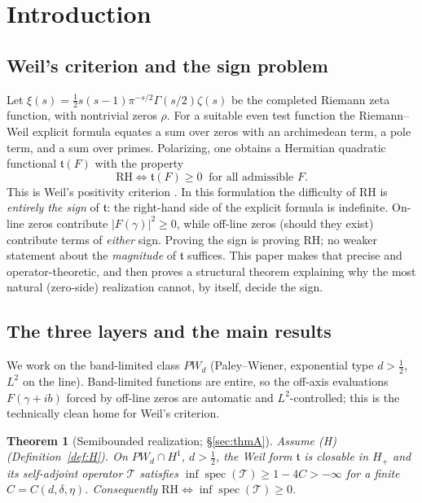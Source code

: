 \documentclass[11pt]{amsart}
\newtheorem{theorem}{Theorem}[section]
\theoremstyle{definition}
\theoremstyle{remark}
\newcommand{\spec}{\operatorname{spec}}
\newcommand{\half}{\tfrac12}
\newcommand{\PW}{\mathit{PW}_d}
\newcommand{\tform}{\mathfrak t}
\newcommand{\Hplus}{H_+}
\newcommand{\Top}{\mathcal T}
\begin{document}
\section{Introduction}\label{sec:intro}
\subsection{Weil's criterion and the sign problem}
Let $\xi(s)=\half s(s-1)\pi^{-s/2}\Gamma(s/2)\zeta(s)$ be the completed Riemann zeta
function, with nontrivial zeros $\rho$. For a suitable even test function the
Riemann--Weil explicit formula equates a sum over zeros with an archimedean term, a
pole term, and a sum over primes. Polarizing, one obtains a Hermitian quadratic
functional $\tform(F)$ with the property
\begin{equation}\label{eq:weil}
\boxed{\ \mathrm{RH}\iff \tform(F)\ge0 \ \text{ for all admissible } F.\ }
\end{equation}
This is Weil's positivity criterion \cite{Weil1952,Bombieri}. In this formulation the
difficulty of RH is \emph{entirely the sign} of $\tform$: the right-hand side of the
explicit formula is indefinite. On-line zeros contribute $|F(\gamma)|^{2}\ge0$, while
off-line zeros (should they exist) contribute terms of \emph{either} sign. Proving the
sign is proving RH; no weaker statement about the \emph{magnitude} of $\tform$ suffices.
This paper makes that precise and operator-theoretic, and then proves a structural
theorem explaining why the most natural (zero-side) realization cannot, by itself,
decide the sign.

\subsection{The three layers and the main results}
We work on the band-limited class $\PW$ (Paley--Wiener, exponential type $d>\half$,
$L^{2}$ on the line). Band-limited functions are entire, so the off-axis evaluations
$F(\gamma+ib)$ forced by off-line zeros are automatic and $L^{2}$-controlled; this is
the technically clean home for Weil's criterion.

\begin{theorem}[Semibounded realization; \S\ref{sec:thmA}]\label{thm:A}
Assume \textnormal{(H)} \textnormal{(Definition~\ref{def:H})}. On $\PW\cap H^{1}$,
$d>\half$, the Weil form $\tform$ is closable in $\Hplus$ and its self-adjoint operator
$\Top$ satisfies $\inf\spec(\Top)\ge 1-4C>-\infty$ for a finite $C=C(d,\delta,\eta)$.
Consequently $\mathrm{RH}\iff\inf\spec(\Top)\ge0$.
\end{theorem}
\end{document}
